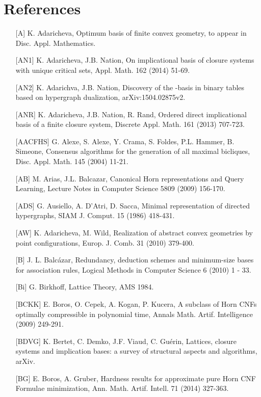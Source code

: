 \documentclass[11pt]{article}
\begin{document}
\section*{References}
\begin{enumerate}
\item[{[A]}] K. Adaricheva, Optimum basis of finite convex geometry, to appear in Disc. Appl. Mathematics.
	\item[{[AN1]}] K. Adaricheva, J.B. Nation, On implicational basis of closure systems with unique critical sets, Appl. Math. 162 (2014) 51-69.
\item[{[AN2]}] K. Adarichva,  J.B. Nation, Discovery of the -basis in binary tables based on hypergraph dualization, arXiv:1504.02875v2.
	\item[{[ANR]}] K. Adaricheva, J.B. Nation, R. Rand, Ordered direct implicational basis of a finite closure system, Discrete Appl. Math. 161 (2013) 707-723.
\item[{[AACFHS]}] G. Alexe, S. Alexe, Y. Crama, S. Foldes, P.L. Hammer, B. Simeone, Consensus algorithms for the generation of all maximal bicliques, Disc. Appl. Math. 145 (2004) 11-21.
	\item [{[AB]}] M. Arias, J.L. Balcazar, Canonical Horn representations and Query Learning, Lecture Notes in Computer Science 5809 (2009) 156-170.
	\item[{[ADS]}] G. Ausiello, A. D'Atri, D. Sacca, Minimal representation of directed hypergraphs, SIAM J. Comput. 15 (1986) 418-431.
\item[{[AW]}] K. Adaricheva, M. Wild, Realization of abstract convex geometries by point configurations, Europ. J. Comb. 31 (2010) 379-400.
\item[{[B]}] J. L. Balc\'{a}zar, Redundancy, deduction schemes and minimum-size bases for association rules, Logical Methods in Computer Science 6 (2010) 1 - 33.
\item[{[Bi]}] G. Birkhoff, Lattice Theory, AMS 1984.
\item[{[BCKK]}] E. Boros, O. Cepek, A. Kogan, P. Kucera, A subclass of Horn CNFs optimally compressible in polynomial time, Annals Math. Artif. Intelligence (2009) 249-291.
\item[{[BDVG]}] K. Bertet, C. Demko, J.F. Viaud, C. Gu\'{e}rin, Lattices, closure systems and implication bases: a survey of structural aspects and algorithms, arXiv.
	\item[{[BG]}] E. Boros, A. Gruber, Hardness results for approximate pure Horn CNF Formulae minimization, Ann. Math. Artif. Intell. 71 (2014) 327-363.

\end{enumerate}
\end{document}
